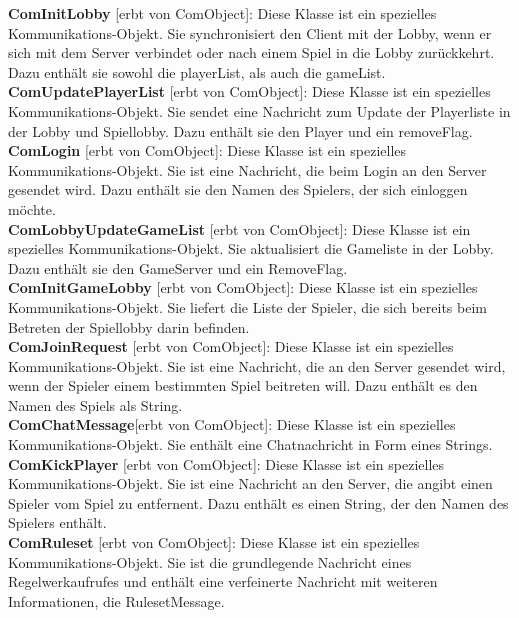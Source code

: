 \documentclass{article}
\begin{document}
\textbf{ComInitLobby} [erbt von ComObject]: Diese Klasse ist ein spezielles Kommunikations-Objekt. Sie synchronisiert den Client mit der Lobby, wenn er sich mit dem Server verbindet oder nach einem Spiel in die Lobby zurückkehrt. Dazu enthält sie sowohl die playerList, als auch die gameList.\\

\textbf{ComUpdatePlayerList} [erbt von ComObject]: Diese Klasse ist ein spezielles Kommunikations-Objekt. Sie sendet eine Nachricht zum Update der Playerliste in der Lobby und Spiellobby. Dazu enthält sie den Player und ein removeFlag.\\
		
\textbf{ComLogin} [erbt von ComObject]: Diese Klasse ist ein spezielles Kommunikations-Objekt. Sie ist eine Nachricht, die beim Login an den Server gesendet wird. Dazu enthält sie den Namen des Spielers, der sich einloggen möchte.\\
		
\textbf{ComLobbyUpdateGameList} [erbt von ComObject]: Diese Klasse ist ein spezielles Kommunikations-Objekt. Sie aktualisiert die Gameliste in der Lobby. Dazu enthält sie den GameServer und ein RemoveFlag.\\
		
\textbf{ComInitGameLobby} [erbt von ComObject]: Diese Klasse ist ein spezielles Kommunikations-Objekt. Sie liefert die Liste der Spieler, die sich bereits beim Betreten der Spiellobby darin befinden. \\

\textbf{ComJoinRequest} [erbt von ComObject]: Diese Klasse ist ein spezielles Kommunikations-Objekt. Sie ist eine Nachricht, die an den Server gesendet wird, wenn der Spieler einem bestimmten Spiel beitreten will. Dazu enthält es den Namen des Spiels als String. \\
		
\textbf{ComChatMessage}[erbt von ComObject]: Diese Klasse ist ein spezielles Kommunikations-Objekt. Sie enthält eine Chatnachricht in Form eines Strings.\\

\textbf{ComKickPlayer} [erbt von ComObject]: Diese Klasse ist ein spezielles Kommunikations-Objekt. Sie ist eine Nachricht an den Server, die angibt einen Spieler vom Spiel zu entfernent. Dazu enthält es einen String, der den Namen des Spielers enthält. \\
		
\textbf{ComRuleset} [erbt von ComObject]: Diese Klasse ist ein spezielles Kommunikations-Objekt. Sie ist die grundlegende Nachricht eines Regelwerkaufrufes und enthält eine verfeinerte Nachricht mit weiteren Informationen, die RulesetMessage. \\
		
\end{document}
